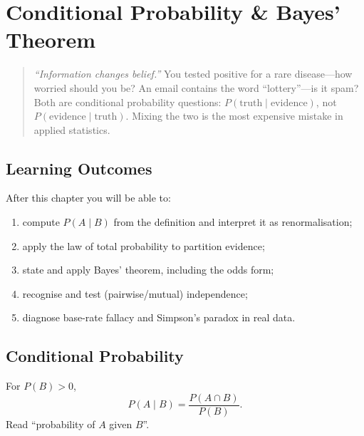 \chapter{Conditional Probability \& Bayes' Theorem}
\label{ch:conditional}

\begin{quote}
\emph{``Information changes belief.''} You tested positive for a rare disease---how worried should you be? An email contains the word ``lottery''---is it spam? Both are conditional probability questions: $P(\text{truth}\mid\text{evidence})$, not $P(\text{evidence}\mid\text{truth})$. Mixing the two is the most expensive mistake in applied statistics.
\end{quote}

\noindent{}
\vspace{0.4em}

\section*{Learning Outcomes}
After this chapter you will be able to:
\begin{enumerate}[label=(L\arabic*)]
    \item compute $P(A\mid B)$ from the definition and interpret it as renormalisation;
    \item apply the law of total probability to partition evidence;
    \item state and apply Bayes' theorem, including the odds form;
    \item recognise and test (pairwise/mutual) independence;
    \item diagnose base-rate fallacy and Simpson's paradox in real data.
\end{enumerate}

\section{Conditional Probability}
\label{sec:conditional-def}

\begin{definition} For $P(B)>0$,
\[
P(A\mid B)=\frac{P(A\cap B)}{P(B)}.
\]
Read ``probability of $A$ given $B$''.
\end{definition}

